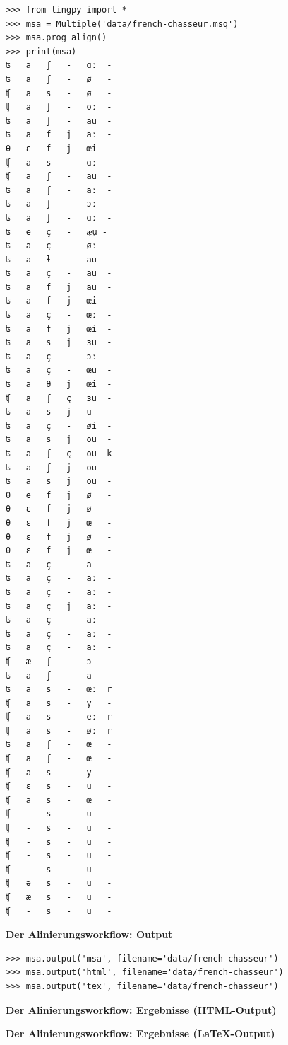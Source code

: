 \begin{verbatim}
>>> from lingpy import *
>>> msa = Multiple('data/french-chasseur.msq')
>>> msa.prog_align()
>>> print(msa)
ʦ   a   ʃ   -   ɑː  -
ʦ   a   ʃ   -   ø   -
ʧ   a   s   -   ø   -
ʧ   a   ʃ   -   oː  -
ʦ   a   ʃ   -   au  -
ʦ   a   f   j   aː  -
θ   ɛ   f   j   œi  -
ʧ   a   s   -   ɑː  -
ʧ   a   ʃ   -   au  -
ʦ   a   ʃ   -   aː  -
ʦ   a   ʃ   -   ɔː  -
ʦ   a   ʃ   -   ɑː  -
ʦ   e   ç   -   æ͜u -
ʦ   a   ç   -   øː  -
ʦ   a   ɬ   -   au  -
ʦ   a   ç   -   au  -
ʦ   a   f   j   au  -
ʦ   a   f   j   œi  -
ʦ   a   ç   -   œː  -
ʦ   a   f   j   œi  -
ʦ   a   s   j   ɜu  -
ʦ   a   ç   -   ɔː  -
ʦ   a   ç   -   œu  -
ʦ   a   θ   j   œi  -
ʧ   a   ʃ   ç   ɜu  -
ʦ   a   s   j   u   -
ʦ   a   ç   -   øi  -
ʦ   a   s   j   ou  -
ʦ   a   ʃ   ç   ou  k
ʦ   a   ʃ   j   ou  -
ʦ   a   s   j   ou  -
θ   e   f   j   ø   -
θ   ɛ   f   j   ø   -
θ   ɛ   f   j   œ   -
θ   ɛ   f   j   ø   -
θ   ɛ   f   j   œ   -
ʦ   a   ç   -   a   -
ʦ   a   ç   -   aː  -
ʦ   a   ç   -   aː  -
ʦ   a   ç   j   aː  -
ʦ   a   ç   -   aː  -
ʦ   a   ç   -   aː  -
ʦ   a   ç   -   aː  -
ʧ   æ   ʃ   -   ɔ   -
ʦ   a   ʃ   -   a   -
ʦ   a   s   -   œː  r
ʧ   a   s   -   y   -
ʧ   a   s   -   eː  r
ʧ   a   s   -   øː  r
ʦ   a   ʃ   -   œ   -
ʧ   a   ʃ   -   œ   -
ʧ   a   s   -   y   -
ʧ   ɛ   s   -   u   -
ʧ   a   s   -   œ   -
ʧ   -   s   -   u   -
ʧ   -   s   -   u   -
ʧ   -   s   -   u   -
ʧ   -   s   -   u   -
ʧ   -   s   -   u   -
ʧ   ə   s   -   u   -
ʧ   æ   s   -   u   -
ʧ   -   s   -   u   -
\end{verbatim}


\par\noindent\textbf{Der Alinierungsworkflow: Output}

\begin{verbatim}
>>> msa.output('msa', filename='data/french-chasseur')
>>> msa.output('html', filename='data/french-chasseur')
>>> msa.output('tex', filename='data/french-chasseur')
\end{verbatim}



\par\noindent\textbf{Der Alinierungsworkflow: Ergebnisse (HTML-Output)}


\par\noindent\textbf{Der Alinierungsworkflow: Ergebnisse (LaTeX-Output)}

